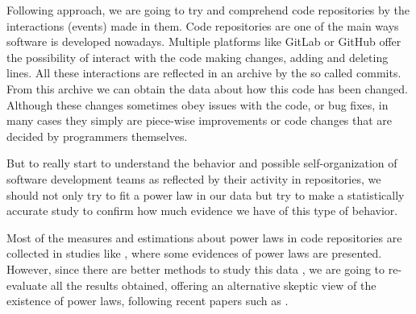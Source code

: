 \documentclass{article}
\begin{document}
Following
\cite{merelo16:self,Merelo2016:repomining,merelo17vue,DBLP:conf/iwann/MereloCV17,merelo2017self}
approach, we are going to try and comprehend code repositories by the
interactions (events) made in them. Code repositories are one of the
main ways software is developed nowadays. Multiple platforms like
GitLab or GitHub offer the possibility of interact with the code
making changes, adding and deleting lines.  All these interactions are
reflected in an archive by the so called commits. From this archive we
can obtain the data about how this code has been changed. Although
these changes sometimes obey issues with the code, or bug fixes, in
many cases they simply are piece-wise improvements or code changes that
are decided by programmers themselves.

But to really start to understand the behavior and possible
self-organization of software development teams as reflected by their
activity in repositories, we should not only try to fit a power law in
our data but try to make a statistically accurate study to confirm how
much evidence we have of this type of behavior.

Most of the measures and estimations about power laws in code
repositories are collected in studies like \cite{merelo2017self},
where some evidences of power laws are presented.  However, since
there are better methods to study this data \cite{clauset2009power},
we are going to re-evaluate all the results obtained, offering an
alternative skeptic view of the existence of power laws, following
recent papers such as \cite{Holme2019,Broido2019}.
\end{document}
